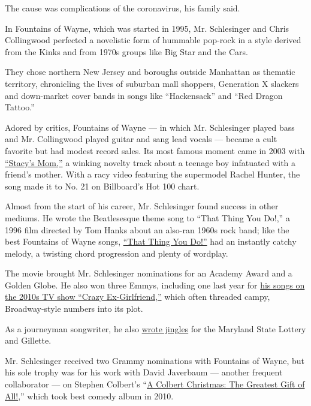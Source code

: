 The cause was complications of the coronavirus, his family said.

In Fountains of Wayne, which was started in 1995, Mr. Schlesinger and
Chris Collingwood perfected a novelistic form of hummable pop-rock in a
style derived from the Kinks and from 1970s groups like Big Star and the
Cars.

They chose northern New Jersey and boroughs outside Manhattan as
thematic territory, chronicling the lives of suburban mall shoppers,
Generation X slackers and down-market cover bands in songs like
``Hackensack'' and ``Red Dragon Tattoo.''

Adored by critics, Fountains of Wayne --- in which Mr. Schlesinger
played bass and Mr. Collingwood played guitar and sang lead vocals ---
became a cult favorite but had modest record sales. Its most famous
moment came in 2003 with
\href{https://www.youtube.com/watch?v=dZLfasMPOU4}{``Stacy's Mom,''} a
winking novelty track about a teenage boy infatuated with a friend's
mother. With a racy video featuring the supermodel Rachel Hunter, the
song made it to No. 21 on Billboard's Hot 100 chart.

Almost from the start of his career, Mr. Schlesinger found success in
other mediums. He wrote the Beatlesesque theme song to ``That Thing You
Do!,'' a 1996 film directed by Tom Hanks about an also-ran 1960s rock
band; like the best Fountains of Wayne songs,
\href{https://www.youtube.com/watch?v=Dsi-eF6-uOY}{``That Thing You
Do!''} had an instantly catchy melody, a twisting chord progression and
plenty of wordplay.

The movie brought Mr. Schlesinger nominations for an Academy Award and a
Golden Globe. He also won three Emmys, including one last year for
\href{https://www.nytimes3xbfgragh.onion/2018/10/10/arts/television/crazy-ex-girlfriend-best-songs.html}{his
songs on the 2010s TV show ``Crazy Ex-Girlfriend,''} which often
threaded campy, Broadway-style numbers into its plot.

As a journeyman songwriter, he also
\href{https://ew.com/article/2007/04/20/adam-schlesingers-musical-resume/}{wrote
jingles} for the Maryland State Lottery and Gillette.

Mr. Schlesinger received two Grammy nominations with Fountains of Wayne,
but his sole trophy was for his work with David Javerbaum --- another
frequent collaborator --- on Stephen Colbert's
``\href{https://www.nytimes3xbfgragh.onion/2008/11/21/arts/television/21colb.html}{A
Colbert Christmas: The Greatest Gift of All!},'' which took best comedy
album in 2010.

